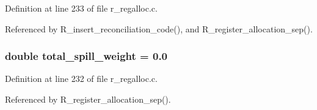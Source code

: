 Definition at line 233 of file r\_\-regalloc.c.

Referenced by R\_\-insert\_\-reconciliation\_\-code(), and R\_\-register\_\-allocation\_\-sep().
\subsubsection{\setlength{\rightskip}{0pt plus 5cm}double \bf{total\_\-spill\_\-weight} = 0.0}\label{r__regalloc_8c_d11ed0e43ea906b2f8df38b402967969}




Definition at line 232 of file r\_\-regalloc.c.

Referenced by R\_\-register\_\-allocation\_\-sep().